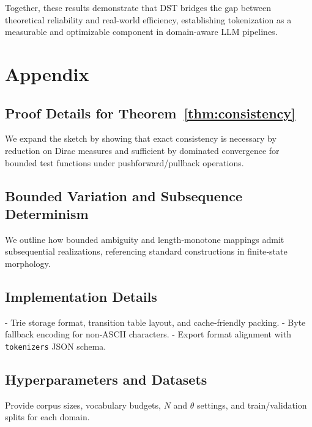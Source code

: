 Together, these results demonstrate that DST bridges the gap between theoretical reliability and real-world efficiency, establishing tokenization as a measurable and optimizable component in domain-aware LLM pipelines.

\appendix
\section{Appendix}


\subsection{Proof Details for Theorem~\ref{thm:consistency}}

We expand the sketch by showing that exact consistency is necessary by reduction on Dirac measures and sufficient by dominated convergence for bounded test functions under pushforward/pullback operations.

\subsection{Bounded Variation and Subsequence Determinism}

We outline how bounded ambiguity and length‑monotone mappings admit subsequential realizations, referencing standard constructions in finite‑state morphology.

\subsection{Implementation Details}

- Trie storage format, transition table layout, and cache‑friendly packing.
- Byte fallback encoding for non‑ASCII characters.
- Export format alignment with \texttt{tokenizers} JSON schema.

\subsection{Hyperparameters and Datasets}

Provide corpus sizes, vocabulary budgets, $N$ and $\theta$ settings, and train/validation splits for each domain.
